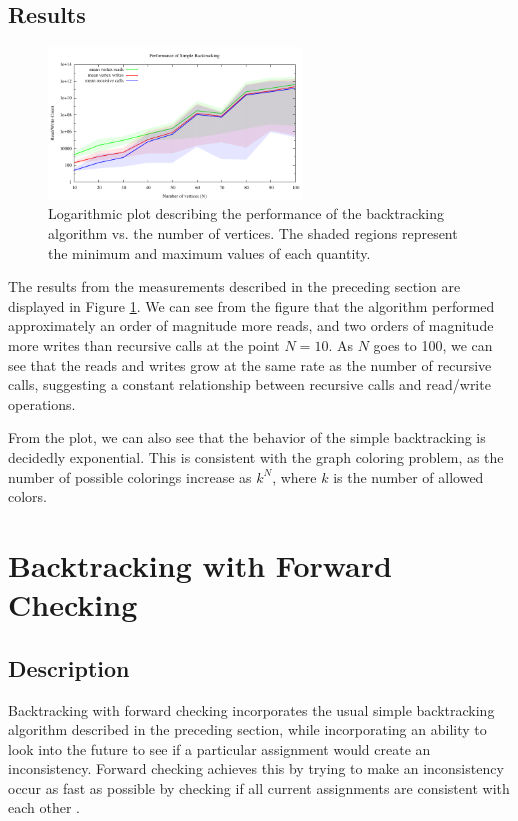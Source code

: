 \documentclass{article}
\begin{document}
	
	\subsection{Results}	
		
		\begin{figure}[h!]
			\centering
			\includegraphics[width=0.6\textwidth]{../results_5/backtracking_simple/bt_simple_performance}
			\caption{Logarithmic plot describing the performance of the backtracking algorithm vs. the number of vertices. The shaded regions represent the minimum and maximum values of each quantity.}
			\label{simple_results}
		\end{figure}
		
		The results from the measurements described in the preceding section are displayed in Figure \ref{simple_results}. We can see from the figure that the algorithm performed approximately an order of magnitude more reads, and two orders of magnitude more writes than recursive calls at the point $N=10$. As $N$ goes to 100, we can see that the reads and writes grow at the same rate as the number of recursive calls, suggesting a constant relationship between recursive calls and read/write operations.
		
		From the plot, we can also see that the behavior of the simple backtracking is decidedly exponential. This is consistent with the graph coloring problem, as the number of possible colorings increase as $k^N$, where $k$ is the number of allowed colors. 
	
\section{Backtracking with Forward Checking}

	\subsection{Description}
	
		Backtracking with forward checking incorporates the usual simple backtracking algorithm described in the preceding section, while incorporating an ability to look into the future to see if a particular assignment would create an inconsistency. Forward checking achieves this by trying to make an inconsistency occur as fast as possible by checking if all current assignments are consistent with each other \cite{haralick}.
		
\end{document}
